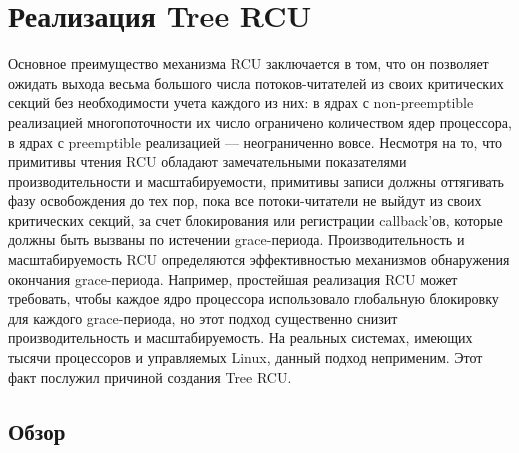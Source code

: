 \section{Реализация Tree RCU}\label{sec:tree_rcu}

Основное преимущество механизма RCU заключается в том, что он позволяет
ожидать выхода весьма большого числа потоков-читателей из своих
критических секций без необходимости учета каждого из них:
в ядрах с non-preemptible реализацией многопоточности их число
ограничено количеством ядер процессора,
в ядрах с preemptible реализацией --- неограниченно вовсе.
Несмотря на то, что примитивы чтения RCU обладают замечательными
показателями производительности и масштабируемости,
примитивы записи должны оттягивать фазу освобождения до тех пор,
пока все потоки-читатели не выйдут из своих критических секций,
за счет блокирования или регистрации callback'ов, которые должны быть
вызваны по истечении grace-периода.
Производительность и масштабируемость RCU определяются
эффективностью механизмов обнаружения окончания grace-периода.
Например, простейшая реализация RCU может требовать,
чтобы каждое ядро процессора использовало глобальную блокировку
для каждого grace-периода, но этот подход существенно снизит
производительность и масштабируемость.
На реальных системах, имеющих тысячи процессоров и управляемых Linux,
данный подход неприменим. Этот факт послужил причиной создания Tree RCU.

\subsection{Обзор}

